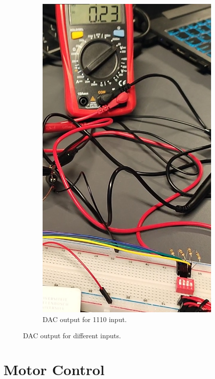 \begin{figure}[H]
\begin{subfigure}[]{0.2\textwidth}
\includegraphics[width=\linewidth]{./Figures/DAC_Prac_1110.jpeg}
\caption{DAC output for 1110 input.} 			
\label{subfig:dac_prac_1110}	
\end{subfigure}
\caption{DAC output for different inputs.}
\label{fig:dac_prac}
\end{figure}

\clearpage
\section{Motor Control}

